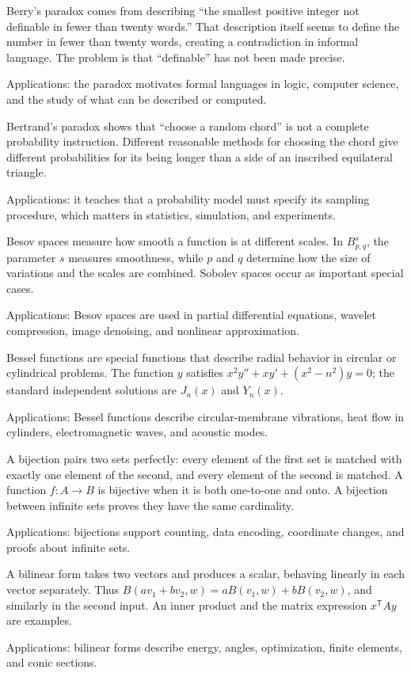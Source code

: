 Berry's paradox comes from describing “the smallest positive integer not definable in fewer than twenty words.” That description itself seems to define the number in fewer than twenty words, creating a contradiction in informal language. The problem is that “definable” has not been made precise. \par\noindent Applications: the paradox motivates formal languages in logic, computer science, and the study of what can be described or computed.

Bertrand's paradox shows that “choose a random chord” is not a complete probability instruction. Different reasonable methods for choosing the chord give different probabilities for its being longer than a side of an inscribed equilateral triangle. \par\noindent Applications: it teaches that a probability model must specify its sampling procedure, which matters in statistics, simulation, and experiments.

Besov spaces measure how smooth a function is at different scales. In $B^s_{p,q}$, the parameter $s$ measures smoothness, while $p$ and $q$ determine how the size of variations and the scales are combined. Sobolev spaces occur as important special cases. \par\noindent Applications: Besov spaces are used in partial differential equations, wavelet compression, image denoising, and nonlinear approximation.

Bessel functions are special functions that describe radial behavior in circular or cylindrical problems. The function $y$ satisfies $x^2y''+xy'+(x^2-n^2)y=0$; the standard independent solutions are $J_n(x)$ and $Y_n(x)$. \par\noindent Applications: Bessel functions describe circular-membrane vibrations, heat flow in cylinders, electromagnetic waves, and acoustic modes.

A bijection pairs two sets perfectly: every element of the first set is matched with exactly one element of the second, and every element of the second is matched. A function $f:A\to B$ is bijective when it is both one-to-one and onto. A bijection between infinite sets proves they have the same cardinality. \par\noindent Applications: bijections support counting, data encoding, coordinate changes, and proofs about infinite sets.

A bilinear form takes two vectors and produces a scalar, behaving linearly in each vector separately. Thus $B(av_1+bv_2,w)=aB(v_1,w)+bB(v_2,w)$, and similarly in the second input. An inner product and the matrix expression $x^{\mathsf T}Ay$ are examples. \par\noindent Applications: bilinear forms describe energy, angles, optimization, finite elements, and conic sections.

